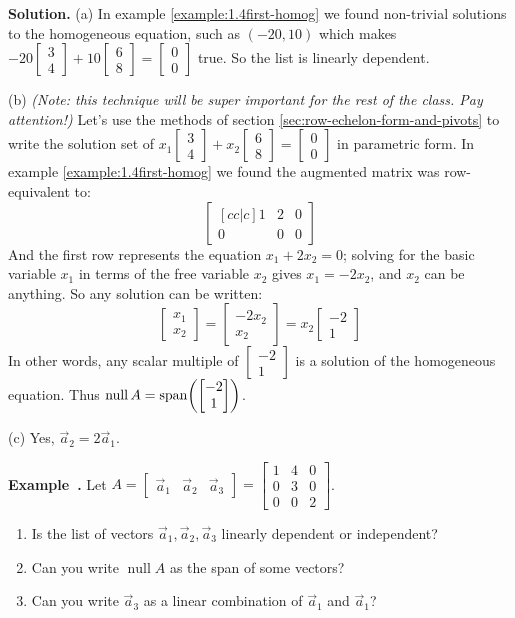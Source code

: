 \documentclass[11pt, letterpaper]{report}
\newenvironment{notes}{}{}
\newenvironment{book}{}{}
\let\originalleft\left
\let\originalright\right
\renewcommand{\left}{\mathopen{}\mathclose\bgroup\originalleft}
\renewcommand{\right}{\aftergroup\egroup\originalright}
\newcounter{example}[section]
\newcommand{\example}{\refstepcounter{example}%
\par\noindent\textbf{Example~\theexample.} }
\DeclareMathOperator{\nul}{null}
\DeclareMathOperator{\spn}{span}
\newcommand{\bbvec}[2]{
  \begin{bmatrix} #1 \\ #2 \end{bmatrix}
}
\begin{document}
\begin{book}
\textbf{Solution.} (a) In example \ref{example:1.4first-homog} we found non-trivial solutions to the homogeneous equation, such as $(-20,10)$ which makes $-20 \bbvec{3}{4} + 10 \bbvec{6}{8} = \bbvec{0}{0}$ true. So the list is linearly dependent.

(b) \emph{(Note: this technique will be super important for the rest of the class. Pay attention!)} Let's use the methods of section \ref{sec:row-echelon-form-and-pivots} to write the solution set of $x_1 \bbvec{3}{4} + x_2 \bbvec{6}{8} = \bbvec{0}{0}$ in parametric form. In example \ref{example:1.4first-homog} we found the augmented matrix was row-equivalent to:
\[\begin{bmatrix}[cc|c]
1 & 2 & 0 \\
0 & 0 & 0 
\end{bmatrix}\]
And the first row represents the equation $x_1+2x_2=0$; solving for the basic variable $x_1$ in terms of the free variable $x_2$ gives $x_1=-2x_2$, and $x_2$ can be anything. So any solution can be written:
\[\bbvec{x_1}{x_2} = \bbvec{-2x_2}{x_2} = x_2 \bbvec{-2}{1}\]
In other words, any scalar multiple of $\bbvec{-2}{1}$ is a solution of the homogeneous equation. Thus $\nul A = \spn \left( \bbvec{-2}{1} \right)$. 

(c) Yes, $\vec{a}_2=2\vec{a}_1$. \blacksquare
\end{book}

\example {}   Let $A = \begin{bmatrix}
\vec{a}_1 & \vec{a}_2 & \vec{a}_3
\end{bmatrix} = \begin{bmatrix}
1 & 4 & 0 \\
0 & 3 & 0 \\
0 & 0 & 2
\end{bmatrix}$.
\begin{enumerate}[label=(\alph*)]
\item Is the list of vectors $\vec{a}_1, \vec{a}_2, \vec{a}_3$ linearly dependent or independent?
\item Can you write $\nul A$ as the span of some vectors?
\item Can you write $\vec{a}_3$ as a linear combination of $\vec{a}_1$ and $\vec{a}_1$?
\end{enumerate}

\begin{notes}
\vfill
\newpage
\end{notes}
\end{document}
